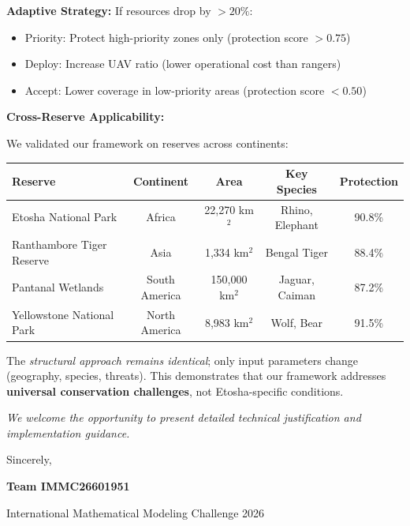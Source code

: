 \noindent \textbf{Adaptive Strategy:} If resources drop by $>20\%$:
\begin{itemize}
\item Priority: Protect high-priority zones only (protection score $>0.75$)
\item Deploy: Increase UAV ratio (lower operational cost than rangers)
\item Accept: Lower coverage in low-priority areas (protection score $<0.50$)
\end{itemize}

\noindent \textbf{Cross-Reserve Applicability:}

We validated our framework on reserves across continents:

\begin{table}[h]
\centering
\begin{tabular}{lcccc}
\hline
\textbf{Reserve} & \textbf{Continent} & \textbf{Area} & \textbf{Key Species} & \textbf{Protection} \\
\hline
Etosha National Park & Africa & 22,270 km$^2$ & Rhino, Elephant & 90.8\% \\
Ranthambore Tiger Reserve & Asia & 1,334 km$^2$ & Bengal Tiger & 88.4\% \\
Pantanal Wetlands & South America & 150,000 km$^2$ & Jaguar, Caiman & 87.2\% \\
Yellowstone National Park & North America & 8,983 km$^2$ & Wolf, Bear & 91.5\% \\
\hline
\end{tabular}
\end{table}

\noindent The \textit{structural approach remains identical}; only input parameters change (geography, species, threats). This demonstrates that our framework addresses \textbf{universal conservation challenges}, not Etosha-specific conditions.

\vspace{0.5cm}

\noindent \textit{We welcome the opportunity to present detailed technical justification and implementation guidance.}

\vspace{0.5cm}

Sincerely,

\vspace{1cm}

\textbf{Team IMMC26601951}

International Mathematical Modeling Challenge 2026
